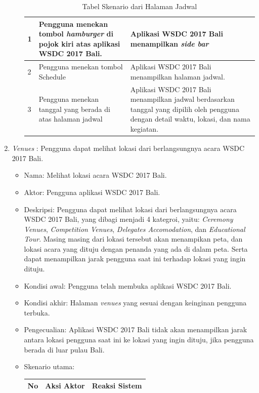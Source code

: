 \begin{enumerate}
\begin{itemize}
\begin{table}[H]
\begin{tabular}{|p{0.5cm}|p{7cm}|p{7cm}|}
				1  & Pengguna menekan tombol {\it hamburger} di pojok kiri atas aplikasi WSDC 2017 Bali. & Aplikasi WSDC 2017 Bali menampilkan {\it side bar} \\ \hline
				2  & Pengguna menekan tombol Schedule & Aplikasi WSDC 2017 Bali menampilkan halaman jadwal. \\ \hline
				3  & Pengguna menekan tanggal yang berada di atas halaman jadwal & Aplikasi WSDC 2017 Bali menampilkan jadwal berdasarkan tanggal yang dipilih oleh pengguna dengan detail waktu, lokasi, dan nama kegiatan. \\ \hline
			\end{tabular}
			\caption{Tabel Skenario dari Halaman Jadwal}
			\label{table:skenarioHalamanJadwal}
		\end{table}
	\end{itemize}
	\item {\it Venues} : Pengguna dapat melihat lokasi dari berlangsungnya acara WSDC 2017 Bali.
	\begin{itemize}
		\item Nama: Melihat lokasi acara WSDC 2017 Bali.
		\item Aktor: Pengguna aplikasi WSDC 2017 Bali.
		\item Deskripsi: Pengguna dapat melihat lokasi dari berlangsungnya acara WSDC 2017 Bali, yang dibagi menjadi 4 kategroi, yaitu: {\it Ceremony Venues}, {\it Competition Venues}, {\it Delegates Accomodation}, dan {\it Educational Tour}. Masing masing dari lokasi tersebut akan menampikan peta, dan lokasi acara yang dituju dengan penanda yang ada di dalam peta. Serta dapat menampilkan jarak pengguna saat ini terhadap lokasi yang ingin dituju.
		\item Kondisi awal: Pengguna telah membuka aplikasi WSDC 2017 Bali.
		\item Kondisi akhir: Halaman {\it venues} yang sesuai dengan keinginan pengguna terbuka.
		\item Pengecualian: Aplikasi WSDC 2017 Bali tidak akan menampilkan jarak antara lokasi pengguna saat ini ke lokasi yang ingin dituju, jika pengguna berada di luar pulau Bali.
		\item Skenario utama: \\
		 \begin{table}[H]
			\centering
			\begin{tabular}{|p{0.5cm}|p{7cm}|p{7cm}|}
				\hline
				No & Aksi Aktor                               & Reaksi Sistem                                          \\ \hline

\end{tabular}
\end{table}
\end{itemize}
\end{enumerate}
